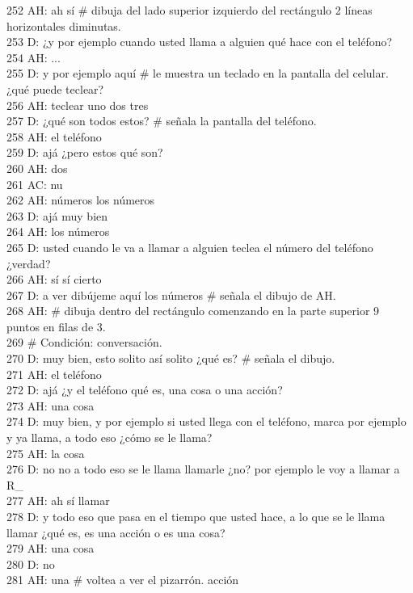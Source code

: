 252 AH: ah sí \# dibuja del lado superior izquierdo del rectángulo 2 líneas horizontales diminutas.\\
253 D: ¿y por ejemplo cuando usted llama a alguien qué hace con el teléfono?\\
254 AH: ...\\
255 D: y por ejemplo aquí \# le muestra un teclado en la pantalla del celular. ¿qué puede teclear?\\
256 AH: teclear uno dos tres\\
257 D: ¿qué son todos estos? \# señala la pantalla del teléfono.\\
258 AH: el teléfono\\
259 D: ajá ¿pero estos qué son?\\
260 AH: dos\\
261 AC: nu\\
262 AH: números los números\\
263 D: ajá muy bien\\
264 AH: los números\\
265 D: usted cuando le va a llamar a alguien teclea el número del teléfono ¿verdad?\\
266 AH: sí sí cierto\\
267 D: a ver dibújeme aquí los números \# señala el dibujo de AH.\\
268 AH: \# dibuja dentro del rectángulo comenzando en la parte superior 9 puntos en filas de 3.\\
269 \# Condición: conversación.\\
270 D: muy bien, esto solito así solito ¿qué es? \# señala el dibujo.\\
271 AH: el teléfono\\
272 D: ajá ¿y el teléfono qué es, una cosa o una acción?\\
273 AH: una cosa\\
274 D: muy bien, y por ejemplo si usted llega con el teléfono, marca por ejemplo y ya llama, a todo eso ¿cómo se le llama?\\
275 AH: la cosa\\
276 D: no no a todo eso se le llama llamarle ¿no? por ejemplo le voy a llamar a R\_\\
277 AH: ah sí llamar\\
278 D: y todo eso que pasa en el tiempo que usted hace, a lo que se le llama llamar ¿qué es, es una acción o es una cosa?\\
279 AH: una cosa\\
280 D: no\\
281 AH: una \# voltea a ver el pizarrón. acción\\

